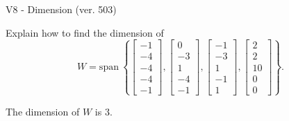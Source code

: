\begin{exercise}
  \begin{exerciseTitle}V8 - Dimension (ver. 503)\end{exerciseTitle}
  \begin{exerciseStatement}
    Explain how to find the dimension of 
\[W=\mathrm{span}\ \left\{\left[\begin{array}{r}
-1 \\
-4 \\
-4 \\
-4 \\
-1
\end{array}\right] , \left[\begin{array}{r}
0 \\
-3 \\
1 \\
-4 \\
-1
\end{array}\right] , \left[\begin{array}{r}
-1 \\
-3 \\
1 \\
-1 \\
1
\end{array}\right] , \left[\begin{array}{r}
2 \\
2 \\
10 \\
0 \\
0
\end{array}\right]\right\}.\]



  \end{exerciseStatement}
  \begin{exerciseAnswer}
   The dimension of \(W\) is  \(3\).
  


  \end{exerciseAnswer}
\end{exercise}